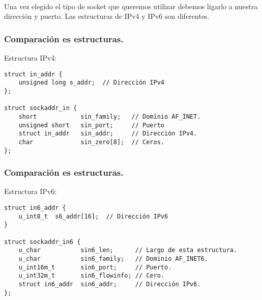 \documentclass{beamer}
\begin{document}
\begin{frame}
	\centering
	\\[0.4cm]
	\small Una vez elegido el tipo de socket que queremos utilizar debemos
	ligarlo a nuestra dirección y puerto. Las estructuras de IPv4 y IPv6 son
	diferentes.
\end{frame}

\begin{frame}[fragile]
	\frametitle{Comparación es estructuras.}
	Estructura IPv4:
	\small
	\begin{verbatim}
struct in_addr {
    unsigned long s_addr;  // Dirección IPv4
};

struct sockaddr_in {
    short            sin_family;   // Dominio AF_INET.
    unsigned short   sin_port;     // Puerto
    struct in_addr   sin_addr;     // Dirección IPv4.
    char             sin_zero[8];  // Ceros.
};
	\end{verbatim}
\end{frame}

\begin{frame}[fragile]
	\frametitle{Comparación es estructuras.}
	Estructura IPv6:
	\small
	\begin{verbatim}
struct in6_addr {
    u_int8_t  s6_addr[16];  // Dirección IPv6
}

struct sockaddr_in6 {
    u_char           sin6_len;      // Largo de esta estructura.
    u_char           sin6_family;   // Dominio AF_INET6.
    u_int16m_t       sin6_port;     // Puerto.
    u_int32m_t       sin6_flowinfo; // Cero.
    struct in6_addr  sin6_addr;     // Dirección IPv6.
};
	\end{verbatim}
\end{frame}
\end{document}
